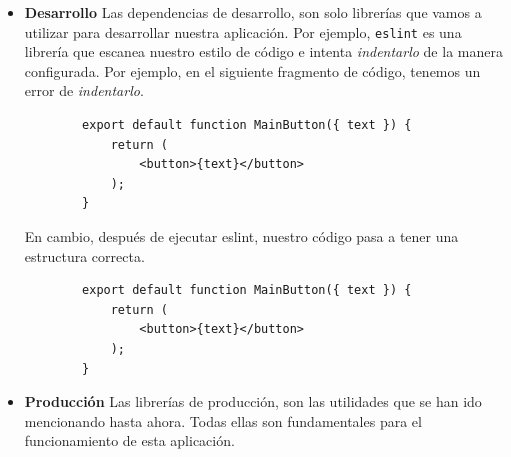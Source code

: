\begin{itemize}
    \item \textbf{Desarrollo}
    Las dependencias de desarrollo, son solo librerías que vamos a utilizar para desarrollar nuestra aplicación. Por ejemplo, \verb|eslint| \cite{web:eslint} es una librería que escanea nuestro estilo de código e intenta \textit{indentarlo} de la manera configurada.
    Por ejemplo, en el siguiente fragmento de código, tenemos un error de \textit{indentarlo}.
    \begin{lstlisting}
        export default function MainButton({ text }) {
            return (
                <button>{text}</button>
            );
        }
    \end{lstlisting}
    En cambio, después de ejecutar eslint, nuestro código pasa a tener una estructura correcta.
    \begin{lstlisting}
        export default function MainButton({ text }) {
            return (
                <button>{text}</button>
            );
        }
    \end{lstlisting}
    \item \textbf{Producción}
    Las librerías de producción, son las utilidades que se han ido mencionando hasta ahora. Todas ellas son fundamentales para el funcionamiento de esta aplicación.
\end{itemize}
